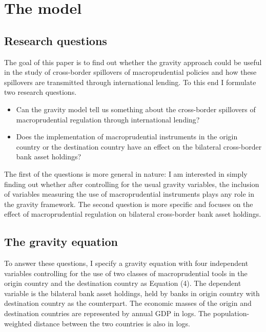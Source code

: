 \documentclass[12pt,a4paper]{article}
\begin{document}
\cleardoublepage
\newpage
\section{The model}

\subsection{Research questions}

The goal of this paper is to find out whether the gravity approach could be useful in the study of cross-border spillovers of macroprudential policies and how these spillovers are transmitted through international lending. To this end I formulate two research questions. 

\begin{itemize}
\item Can the gravity model tell us something about the cross-border spillovers of macroprudential regulation through international lending?
\item Does the implementation of macroprudential instruments in the origin country or the destination country have an effect on the bilateral cross-border bank asset holdings?
\end{itemize}

The first of the questions is more general in nature: I am interested in simply finding out whether after controlling for the usual gravity variables, the inclusion of variables measuring the use of macroprudential instruments plays any role in the gravity framework. The second question is more specific and focuses on the effect of macroprudential regulation on bilateral cross-border bank asset holdings. 

\subsection{The gravity equation}

To answer these questions, I specify a gravity equation with four independent variables controlling for the use of two classes of macroprudential tools in the origin country and the destination country as Equation (4). The dependent variable is the bilateral bank asset holdings, held by banks in origin country with destination country as the counterpart. The economic masses of the origin and destination countries are represented by annual GDP in logs. The population-weighted distance between the two countries is also in logs. 
\end{document}
